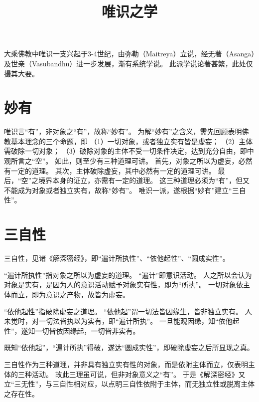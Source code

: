 \documentclass[11pt]{article}
\title{唯识之学}
\date{}
\begin{document}
  \maketitle

  \linenumbers

大乘佛教中唯识一支兴起于3-4世纪，由弥勒（Maitreya）立说，经无著（Asanga）及世亲（Vasubandhu）进一步发展，渐有系统学说。
此派学说论著甚繁，此处仅撮其大要。

\section{妙有}
唯识言“有”，非对象之“有”，故称“妙有”。
为解“妙有”之含义，需先回顾表明佛教基本理念的三个命题，即
（1）一切对象，或者独立实有皆是虚妄；
（2）主体需破除一切对象；
（3）破除对象的主体不受一切条件决定，达到充分自由，即中观所言之“空”。
如此，则至少有三种道理可讲。
首先，对象之所以为虚妄，必然有一定的道理。
其次，主体破除虚妄，其中必然有一定的道理可讲。
最后，“空”之境界本身的证立，亦需有一定的道理。
这三种道理必须为“有”，但又不能成为对象或者独立实有，故称“妙有”。
唯识一派，遂根据“妙有”建立“三自性”。

\section{三自性}
三自性，见诸《解深密经》，即“遍计所执性”、“依他起性”、“圆成实性”。

\newline

“遍计所执性”指对象之所以为虚妄的道理。
“遍计”即意识活动。
人之所以会认为对象是实有，是因为人的意识活动赋予对象实有性，即为“所执”。
一切对象依主体而立，即为意识之产物，故皆为虚妄。

\newline

“依他起性”指破除虚妄之道理。
“依他起”谓一切法皆因缘生，皆非独立实有。
人未觉时，对一切法皆执以为实有，即“遍计所执”。
一旦能观因缘，知“依他起性”，遂知一切皆依因缘起，一切皆非实有。

\newline

既知“依他起”，“遍计所执”得破，遂达“圆成实性”，即破除虚妄之后所显现之真。

\newline

三自性作为三种道理，并非具有独立实有性的对象，而是依附主体而立，仅表明主体的三种活动。
故此三理虽可说，但非对象意义之“有”。
于是《解深密经》又立“三无性”，与三自性相对应，以点明三自性依附于主体，而无独立性或脱离主体之存在性。
\end{document}
